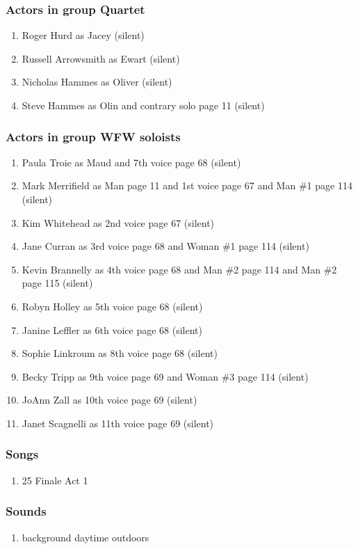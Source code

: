 \subsubsection{Actors in group Quartet}
\begin{enumerate}
\item Roger Hurd as Jacey (silent)
\item Russell Arrowsmith as Ewart (silent)
\item Nicholas Hammes as Oliver (silent)
\item Steve Hammes as Olin and contrary solo page 11 (silent)
\end{enumerate}
\subsubsection{Actors in group WFW soloists}
\begin{enumerate}
\item Paula Troie as Maud and 7th voice page 68 (silent)
\item Mark Merrifield as Man page 11 and 1st voice page 67 and Man \#1 page 114 (silent)
\item Kim Whitehead as 2nd voice page 67 (silent)
\item Jane Curran as 3rd voice page 68 and Woman \#1 page 114 (silent)
\item Kevin Brannelly as 4th voice page 68 and Man \#2 page 114 and Man \#2 page 115 (silent)
\item Robyn Holley as 5th voice page 68 (silent)
\item Janine Leffler as 6th voice page 68 (silent)
\item Sophie Linkroum as 8th voice page 68 (silent)
\item Becky Tripp as 9th voice page 69 and Woman \#3 page 114 (silent)
\item JoAnn Zall as 10th voice page 69 (silent)
\item Janet Scagnelli as 11th voice page 69 (silent)
\end{enumerate}

\subsubsection{Songs}
\begin{enumerate}
\item 25 Finale Act 1
\end{enumerate}\subsubsection{Sounds}
\begin{enumerate}
\item background daytime outdoors
\end{enumerate}
